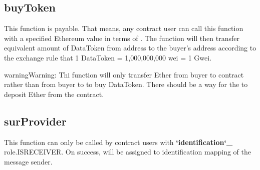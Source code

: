 \documentclass[letterpaper,10pt,english]{sphinxmanual}
\begin{document}
\subsection{buyToken}
\label{\detokenize{PublicFunctions:buytoken}}
%
\begin{sphinxVerbatim}[commandchars=\\\{\},numbers=left,firstnumber=1,stepnumber=1]
 
 
          
     
\end{sphinxVerbatim}

This function is payable. That means, any contract user can call this function with a specified Ethereum value in terms of .
The function will then transfer equivalent amount of DataToken from  address to the buyer’s address according to
the exchange rule that 1 DataToken = 1,000,000,000 wei = 1 Gwei.

\begin{sphinxadmonition}{warning}{Warning:}
Thi function will only transfer Ether from buyer to contract rather than from buyer to  to buy DataToken. There should be a way for the  to deposit Ether from the contract.
\end{sphinxadmonition}


\subsection{surProvider}
\label{\detokenize{PublicFunctions:surprovider}}
%
\begin{sphinxVerbatim}[commandchars=\\\{\}]
     
\end{sphinxVerbatim}

This function can only be called by contract users with {\color{red}\bfseries{}{}`identification{}`\_} role.ISRECEIVER.
On success,  will be assigned to identification mapping of the message sender.
\end{document}
